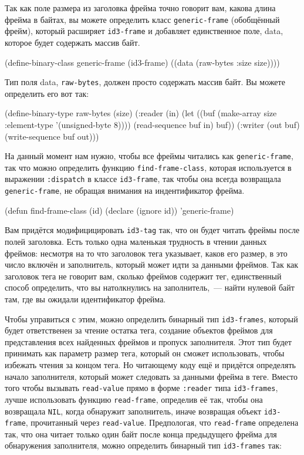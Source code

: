 Так как поле размера из заголовка фрейма точно говорит вам, какова длина фрейма в байтах,
вы можете определить класс \lstinline{generic-frame} (обобщённый фрейм), который расширяет \lstinline{id3-frame} и
добавляет единственное поле, data, которое будет содержать массив байт.

\begin{myverb}
(define-binary-class generic-frame (id3-frame)
  ((data (raw-bytes :size size))))
\end{myverb}

Тип поля data, \lstinline{raw-bytes}, должен просто содержать массив байт. Вы можете определить его
вот так:

\begin{myverb}
(define-binary-type raw-bytes (size)
  (:reader (in)
    (let ((buf (make-array size :element-type '(unsigned-byte 8))))
      (read-sequence buf in)
      buf))
  (:writer (out buf)
    (write-sequence buf out)))
\end{myverb}

На данный момент нам нужно, чтобы все фреймы читались как \lstinline{generic-frame}, так что можно
определить функцию \lstinline{find-frame-class}, которая используется в выражении \lstinline{:dispatch} в классе
\lstinline{id3-frame}, так чтобы она всегда возвращала \lstinline{generic-frame}, не обращая внимания на
индентификатор фрейма.

\begin{myverb}
(defun find-frame-class (id)
  (declare (ignore id))
  'generic-frame)
\end{myverb}

Вам придётся модифицицировать \lstinline{id3-tag} так, что он будет читать фреймы после полей
заголовка. Есть только одна маленькая трудность в чтении данных фреймов: несмотря на то
что заголовок тега указывает, каков его размер, в это число включён и заполнитель,
который может идти за данными фреймов. Так как заголовок тега не говорит вам, сколько
фреймов содержит тег, единственный способ определить, что вы натолкнулись на
заполнитель,~--- найти нулевой байт там, где вы ожидали идентификатор фрейма.

Чтобы управиться с этим, можно определить бинарный тип \lstinline{id3-frames}, который будет
ответственен за чтение остатка тега, создание объектов фреймов для представления всех
найденных фреймов и пропуск заполнителя. Этот тип будет принимать как параметр размер
тега, который он сможет использовать, чтобы избежать чтения за концом тега. Но читающему
коду ещё и придётся определять начало заполнителя, который может следовать за данными
фрейма в теге. Вместо того чтобы вызывать \lstinline{read-value} прямо в форме \lstinline{:reader} типа
\lstinline{id3-frames}, лучше использовать функцию \lstinline{read-frame}, определив её так, чтобы она возвращала
\lstinline{NIL}, когда обнаружит заполнитель, иначе возвращая объект \lstinline{id3-frame}, прочитанный через
\lstinline{read-value}. Предпологая, что \lstinline{read-frame} определена так, что она читает только один байт
после конца предыдущего фрейма для обнаружения заполнителя, можно определить бинарный тип
\lstinline{id3-frames} так:

